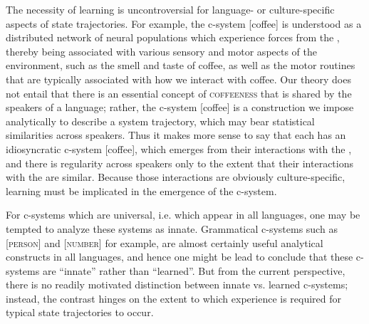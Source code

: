 The necessity of learning is uncontroversial for language- or culture-specific aspects of state trajectories. For example, the c-system [coffee] is understood as a distributed network of neural populations which experience forces from the  , thereby being associated with various sensory and motor aspects of the environment, such as the smell and taste of coffee, as well as the motor routines that are typically associated with how we interact with coffee. Our theory does not entail that there is an essential concept of \textsc{coffeeness} that is shared by the speakers of a language; rather, the c-system [coffee] is a construction we impose analytically to describe a system trajectory, which may bear statistical similarities across speakers. Thus it makes more sense to say that each  has an idiosyncratic c-system [coffee], which emerges from their interactions with the , and there is regularity across speakers only to the extent that their interactions with the  are similar. Because those interactions are obviously culture-specific, learning must be implicated in the emergence of the c-system.

For c-systems which are universal, i.e. which appear in all languages, one may be tempted to analyze these systems as innate. Grammatical c-systems such as [\textsc{person}] and [\textsc{number}] for example, are almost certainly useful analytical constructs in all languages, and hence one might be lead to conclude that these c-systems are “innate” rather than “learned”. But from the current perspective, there is no readily motivated distinction between innate vs. learned c-systems; instead, the contrast hinges on the extent to which experience is required for typical state trajectories to occur. 

